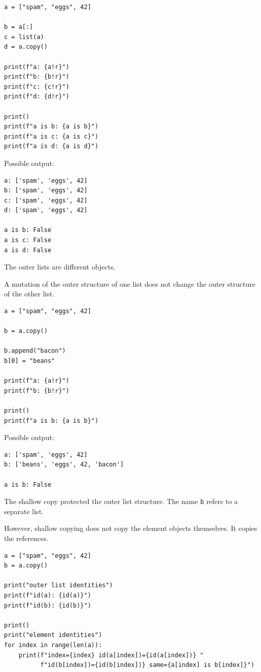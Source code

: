 \begin{verbatim}
a = ["spam", "eggs", 42]

b = a[:]
c = list(a)
d = a.copy()

print(f"a: {a!r}")
print(f"b: {b!r}")
print(f"c: {c!r}")
print(f"d: {d!r}")

print()
print(f"a is b: {a is b}")
print(f"a is c: {a is c}")
print(f"a is d: {a is d}")
\end{verbatim}

Possible output:

\begin{verbatim}
a: ['spam', 'eggs', 42]
b: ['spam', 'eggs', 42]
c: ['spam', 'eggs', 42]
d: ['spam', 'eggs', 42]

a is b: False
a is c: False
a is d: False
\end{verbatim}

The outer lists are different objects.

A mutation of the outer structure of one list does not change the outer structure of the other list.

\begin{verbatim}
a = ["spam", "eggs", 42]

b = a.copy()

b.append("bacon")
b[0] = "beans"

print(f"a: {a!r}")
print(f"b: {b!r}")

print()
print(f"a is b: {a is b}")
\end{verbatim}

Possible output:

\begin{verbatim}
a: ['spam', 'eggs', 42]
b: ['beans', 'eggs', 42, 'bacon']

a is b: False
\end{verbatim}

The shallow copy protected the outer list structure. The name \texttt{b} refers to a separate list.

However, shallow copying does not copy the element objects themselves. It copies the references.

\begin{verbatim}
a = ["spam", "eggs", 42]
b = a.copy()

print("outer list identities")
print(f"id(a): {id(a)}")
print(f"id(b): {id(b)}")

print()
print("element identities")
for index in range(len(a)):
    print(f"index={index} id(a[index])={id(a[index])} "
          f"id(b[index])={id(b[index])} same={a[index] is b[index]}")
\end{verbatim}

